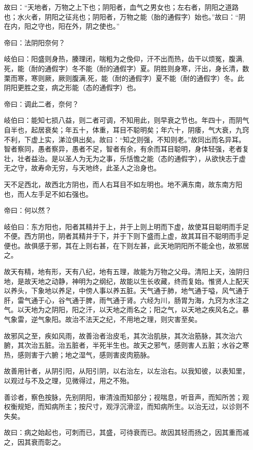 \documentclass{article}%
\begin{document}
故曰：“天地者，万物之上下也；阴阳者，血气之男女也；左右者，阴阳之道路也；水火者，阴阳之征兆也；阴阳者，万物之能（胎的通假字）始也。”故曰：“阴在内，阳之守也，阳在外，阴之使也。”

帝曰：法阴阳奈何？

岐伯曰：阳盛则身热，腠理闭，喘粗为之俛仰，汗不出而热，齿干以烦冤，腹满,死，能（耐的通假字）冬不能（耐的通假字）夏。阴胜则身寒，汗出，身长清，数栗而寒，寒则厥，厥则腹满,死，能（耐的通假字）夏不能（耐的通假字）冬。此阴阳更胜之变，病之形能（态的通假字）也。

帝曰：调此二者，奈何？

岐伯曰：能知七损八益，则二者可调，不知用此，则早衰之节也。年四十，而阴气自半也，起居衰矣；年五十，体重，耳目不聪明矣；年六十，阴痿，气大衰，九窍不利，下虚上实，涕泣俱出矣。故曰：“知之则强，不知则老。”故同出而名异耳。智者察同，愚者察异，愚者不足，智者有余，有余而耳目聪明，身体轻强，老者复壮，壮者益治。是以圣人为无为之事，乐恬憺之能（态的通假字），从欲快志于虚无之守，故寿命无穷，与天地终，此圣人之治身也。

天不足西北，故西北方阴也，而人右耳目不如左明也。地不满东南，故东南方阳也，而人左手足不如右强也。

帝曰：何以然？

岐伯曰：东方阳也，阳者其精并于上，并于上则上明而下虚，故使耳目聪明而手足不便。西方阴也，阴者其精并于下，并于下则下盛而上虚，故其耳目不聪明而手足便也。故俱感于邪，其在上则右甚，在下则左甚，此天地阴阳所不能全也，故邪居之。

故天有精，地有形，天有八纪，地有五理，故能为万物之父母。清阳上天，浊阴归地，是故天地之动静，神明为之纲纪，故能以生长收藏，终而复始。惟贤人上配天以养头，下象地以养足，中傍人事以养五脏。天气通于肺，地气通于嗌，风气通于肝，雷气通于心，谷气通于脾，雨气通于肾。六经为川，肠胃为海，九窍为水注之气。以天地为之阴阳，阳之汗，以天地之雨名之；阳之气，以天地之疾风名之。暴气象雷，逆气象阳。故治不法天之纪，不用地之理，则灾害至矣。

故邪风之至，疾如风雨，故善治者治皮毛，其次治肌肤，其次治筋脉，其次治六腑，其次治五脏。治五脏者，半死半生也。故天之邪气，感则害人五脏；水谷之寒热，感则害于六腑；地之湿气，感则害皮肉筋脉。

故善用针者，从阴引阳，从阳引阴，以右治左，以左治右。以我知彼，以表知里，以观过与不及之理，见微得过，用之不殆。

善诊者，察色按脉，先别阴阳，审清浊而知部分；视喘息，听音声，而知所苦；观权衡规矩，而知病所主；按尺寸，观浮沉滑涩，而知病所生。以治无过，以诊则不失矣。

故曰：病之始起也，可刺而已，其盛，可待衰而已。故因其轻而扬之，因其重而减之，因其衰而彰之。
\end{document}
